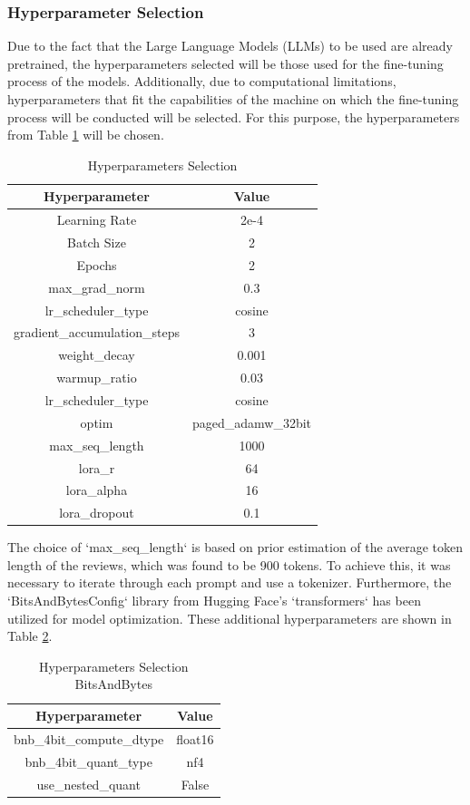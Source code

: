 \subsubsection{Hyperparameter Selection}
Due to the fact that the Large Language Models (LLMs) to be used are already pretrained, the hyperparameters selected will be those used for the fine-tuning process of the models. Additionally, due to computational limitations, hyperparameters that fit the capabilities of the machine on which the fine-tuning process will be conducted will be selected. For this purpose, the hyperparameters from Table \ref{table:hyperparameters} will be chosen.
\begin{table}[H]
    \centering
    \begin{tabular}{|c|c|}
        \hline
        \textbf{Hyperparameter} & \textbf{Value} \\
        \hline
        Learning Rate & 2e-4 \\
        Batch Size & 2 \\
        Epochs & 2 \\
        max\_grad\_norm & 0.3 \\
        lr\_scheduler\_type & cosine\\
        gradient\_accumulation\_steps & 3 \\
        weight\_decay & 0.001 \\
        warmup\_ratio & 0.03 \\
        lr\_scheduler\_type & cosine \\
        optim & paged\_adamw\_32bit \\
        max\_seq\_length & 1000 \\
        lora\_r & 64 \\
        lora\_alpha & 16 \\
        lora\_dropout & 0.1\\
        \hline
    \end{tabular}
    \caption{Hyperparameters Selection}
    \label{table:hyperparameters}
\end{table}
The choice of `max\_seq\_length` is based on prior estimation of the average token length of the reviews, which was found to be 900 tokens. To achieve this, it was necessary to iterate through each prompt and use a tokenizer. Furthermore, the `BitsAndBytesConfig` library from Hugging Face's `transformers` has been utilized for model optimization. These additional hyperparameters are shown in Table \ref{table:hyperparameters-bitsandbytes}.
\begin{table}[H]
    \centering
    \begin{tabular}{|c|c|}
        \hline
        \textbf{Hyperparameter} & \textbf{Value} \\
        \hline
        bnb\_4bit\_compute\_dtype & float16 \\
        bnb\_4bit\_quant\_type & nf4 \\
        use\_nested\_quant & False \\
        \hline
    \end{tabular}
    \caption{Hyperparameters Selection BitsAndBytes}
    \label{table:hyperparameters-bitsandbytes}
\end{table}

